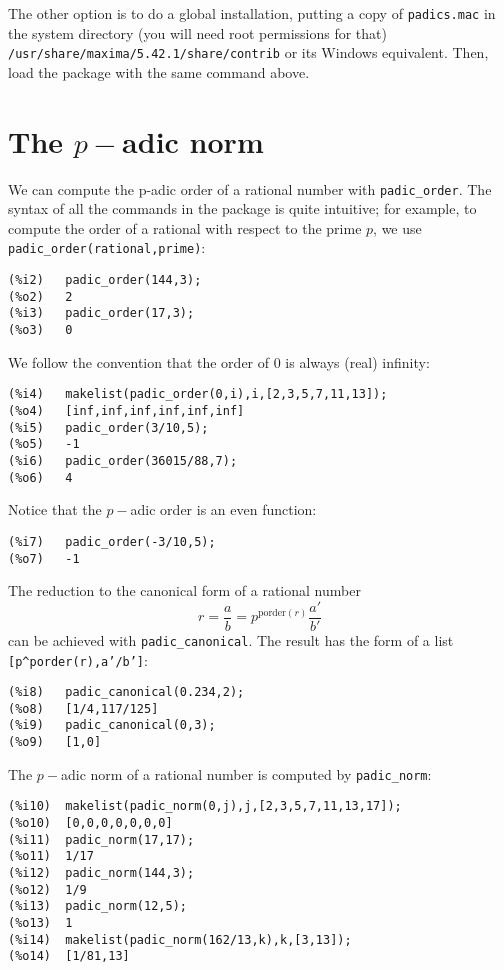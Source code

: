 \documentclass[fleqn]{cas-sc}
\begin{document}
The other option is to do a global installation, putting a copy of \texttt{padics.mac} in 
the system directory (you will need root permissions for that) \texttt{/usr/share/maxima/5.42.1/share/contrib} or its Windows equivalent. Then, load the package with the same command above.


\section{The $p-$adic norm}\label{sec2}

We can compute the p-adic order of a rational number with \texttt{padic\_order}.
The syntax of all the commands in the package is quite intuitive; for example,
to compute the order of a rational with respect to the prime $p$, we use \texttt{padic\_order(rational,prime)}:

\begin{verbatim}
(%i2)	padic_order(144,3);
(%o2)	2
(%i3)	padic_order(17,3);
(%o3)	0
\end{verbatim}

We follow the convention that the order of $0$ is always (real) infinity:

\begin{verbatim}
(%i4)	makelist(padic_order(0,i),i,[2,3,5,7,11,13]);
(%o4)	[inf,inf,inf,inf,inf,inf]
(%i5)	padic_order(3/10,5);
(%o5)	-1
(%i6)	padic_order(36015/88,7);
(%o6)	4
\end{verbatim}

Notice that the $p-$adic order is an even function:
\begin{verbatim}
(%i7)	padic_order(-3/10,5);
(%o7)	-1
\end{verbatim}

The reduction to the canonical form of a rational number
$$
r=\frac{a}{b}=p^{\mathrm{porder}(r)} \frac{a'}{b'}
$$
can be achieved with \texttt{padic\_canonical}. The result has the form of a list 
\texttt{[p\^{}porder(r),a'/b']}:
\begin{verbatim}
(%i8)	padic_canonical(0.234,2);
(%o8)	[1/4,117/125]
(%i9)	padic_canonical(0,3);
(%o9)	[1,0]
\end{verbatim}

The $p-$adic norm of a rational number is computed by \texttt{padic\_norm}:
\begin{verbatim}
(%i10)	makelist(padic_norm(0,j),j,[2,3,5,7,11,13,17]);
(%o10)	[0,0,0,0,0,0,0]
(%i11)	padic_norm(17,17);
(%o11)	1/17
(%i12)	padic_norm(144,3);
(%o12)	1/9
(%i13)	padic_norm(12,5);
(%o13)	1
(%i14)	makelist(padic_norm(162/13,k),k,[3,13]);
(%o14)	[1/81,13]
\end{verbatim}
\end{document}
